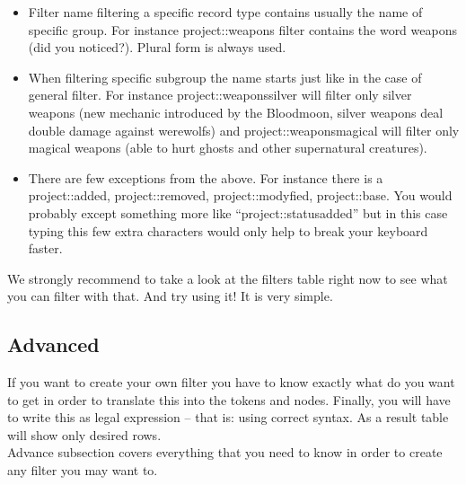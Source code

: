 \begin{itemize}
 \item Filter name filtering a specific record type contains usually the name of specific group. For instance project::weapons filter contains the word weapons (did you noticed?). Plural form is always used.
 \item When filtering specific subgroup the name starts just like in the case of general filter. For instance project::weaponssilver will filter only silver weapons (new mechanic introduced by the Bloodmoon, silver weapons deal double damage against werewolfs) and project::weaponsmagical will filter only magical weapons (able to hurt ghosts and other supernatural creatures).
 \item There are few exceptions from the above. For instance there is a project::added, project::removed, project::modyfied, project::base. You would probably except something more like ``project::statusadded'' but in this case typing this few extra characters would only help to break your keyboard faster.
\end{itemize}

We strongly recommend to take a look at the filters table right now to see what you can filter with that. And try using it! It is very simple.

\subsection{Advanced}
If you want to create your own filter you have to know exactly what do you want to get in order to translate this into the tokens and nodes. Finally, you will have to write this as legal expression -- that is: using correct syntax. As a result table will show only desired rows.\\
Advance subsection covers everything that you need to know in order to create any filter you may want to.
